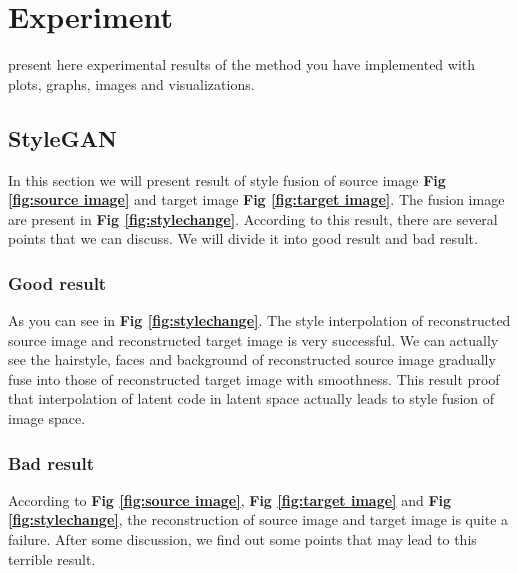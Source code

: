 \usepackage{titlesec}
\newcommand{\subsubsubsection}[1]{\paragraph{#1}\mbox{}\\}
\setcounter{secnumdepth}{4}
\setcounter{tocdepth}{4}

\section{Experiment}
present here experimental results of the method you have implemented with plots, graphs, images and visualizations.

\subsection{StyleGAN}
In this section we will present result of style fusion of source image \textbf{Fig \ref{fig:source image}} and target image \textbf{Fig \ref{fig:target image}}. The fusion image are present in \textbf{Fig \ref{fig:stylechange}}. According to this result, there are several points that we can discuss. We will divide it into good result and bad result.

\subsubsection{Good result}
As you can see in \textbf{Fig \ref{fig:stylechange}}. The style interpolation of reconstructed source image and reconstructed target image is very successful. We can actually see the hairstyle, faces and background of reconstructed source image gradually fuse into those of reconstructed target image with smoothness. This result proof that interpolation of latent code in latent space actually leads to style fusion of image space.

\subsubsection{Bad result}
According to \textbf{Fig \ref{fig:source image}}, \textbf{Fig \ref{fig:target image}} and \textbf{Fig \ref{fig:stylechange}}, the reconstruction of source image and target image is quite a failure. After some discussion, we find out some points that may lead to this terrible result.

